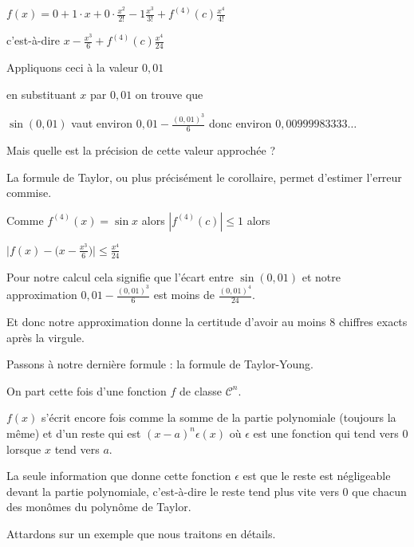 $f(x)=0+1\cdot x +0\cdot \frac{x^2}{2!}-1\frac{x^3}{3!} + f^{(4)}(c)\frac{x^4}{4!}$

\change

c'est-à-dire 
$x -\frac{x^3}{6} + f^{(4)}(c)\frac{x^4}{24}$

\change

Appliquons ceci à la valeur  $0,01$ 

en substituant $x$ par $0,01$ on trouve que

 $\sin(0,01)$ vaut environ $0,01 - \frac{(0,01)^3}{6}$ donc environ $0,00999983333\ldots$

\change

Mais quelle est la précision de cette valeur approchée ?

La formule de Taylor, ou plus précisément le corollaire,
permet d'estimer l'erreur commise.

Comme $f^{(4)}(x)=\sin x$ alors 
$|f^{(4)}(c)|\le 1$ alors 

$\big|f(x) - \big(x -\frac{x^3}{6} \big) \big| \le \frac{x^4}{24}$

\change

Pour notre calcul cela signifie que l'écart entre $\sin(0,01)$
et notre approximation $0,01 - \frac{(0,01)^3}{6}$
est moins de $\frac{(0,01)^4}{24}$.

\change

Et donc notre approximation donne la certitude d'avoir au moins $8$ chiffres exacts après la virgule.



\diapo

Passons à notre dernière formule : la formule de Taylor-Young.

On part cette fois d'une fonction $f$ de classe $\mathcal{C}^n$.

$f(x)$ s'écrit encore fois comme la somme de la partie polynomiale (toujours la même)
et d'un reste
qui est $(x-a)^n\epsilon(x)$
où $\epsilon$ est une fonction qui tend vers $0$ lorsque $x$ tend vers $a$.

La seule information que donne cette fonction $\epsilon$ est que le reste
est négligeable devant la partie polynomiale, c'est-à-dire le reste tend plus vite vers
$0$ que chacun des monômes du polynôme de Taylor.



\diapo


Attardons sur un exemple que nous traitons en détails.

